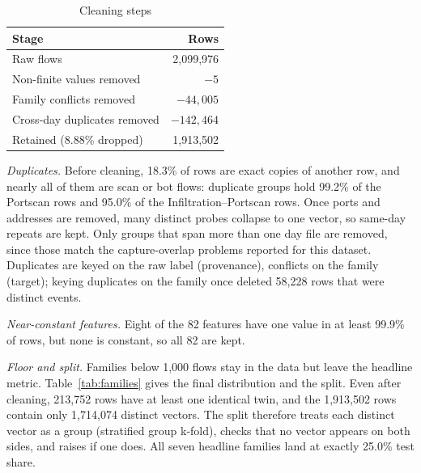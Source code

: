 \begin{table}[h]
\centering
\caption{Cleaning steps}
\label{tab:clean}
\footnotesize
\begin{tabular}{@{}lr@{}}
\toprule
Stage & Rows\\
\midrule
Raw flows & 2,099,976\\ %
Non-finite values removed & $-5$\\ %
Family conflicts removed & $-44,005$\\ %
Cross-day duplicates removed & $-142,464$\\ %
Retained (8.88\% dropped) & 1,913,502\\ %
\bottomrule
\end{tabular}
\end{table}

\emph{Duplicates.} Before cleaning, 18.3\% of rows are exact copies of another row, and %
nearly all of them are scan or bot flows: duplicate groups hold 99.2\% of the Portscan %
rows and 95.0\% of the Infiltration--Portscan rows. %
Once ports and addresses are removed, many distinct probes collapse to
one vector, so same-day repeats are kept. Only groups that span more than one day file
are removed, since those match the capture-overlap problems reported for this dataset.
Duplicates are keyed on the raw label (provenance), conflicts on the family (target);
keying duplicates on the family once deleted 58,228 rows that were distinct events. %

\emph{Near-constant features.} Eight of the 82 features have one value in at least %
99.9\% of rows, but none is constant, so all 82 are kept. %

\emph{Floor and split.} Families below 1,000 flows stay in the data but leave the %
headline metric. Table~\ref{tab:families} gives the final distribution and the split.
Even after cleaning, 213,752 rows have at least one identical twin, and the 1,913,502 %
rows contain only 1,714,074 distinct vectors. %
The split therefore treats each distinct vector as a group
(stratified group k-fold), checks that no vector appears on both sides, and raises if
one does. All seven headline families land at exactly 25.0\% test share. %

